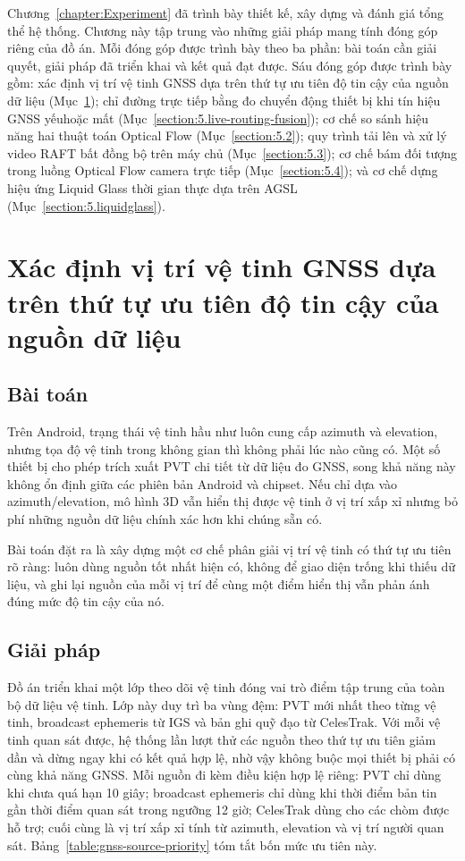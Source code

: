 \documentclass[../DoAn.tex]{subfiles}
\begin{document}
Chương~\ref{chapter:Experiment} đã trình bày thiết kế, xây dựng và đánh giá tổng thể hệ thống. Chương này tập trung vào những giải pháp mang tính đóng góp riêng của đồ án. Mỗi đóng góp được trình bày theo ba phần: bài toán cần giải quyết, giải pháp đã triển khai và kết quả đạt được. Sáu đóng góp được trình bày gồm: xác định vị trí vệ tinh GNSS dựa trên thứ tự ưu tiên độ tin cậy của nguồn dữ liệu (Mục~\ref{section:5.1}); chỉ đường trực tiếp bằng đo chuyển động thiết bị khi tín hiệu GNSS yếuhoặc mất (Mục~\ref{section:5.live-routing-fusion}); cơ chế so sánh hiệu năng hai thuật toán Optical Flow (Mục~\ref{section:5.2}); quy trình tải lên và xử lý video RAFT bất đồng bộ trên máy chủ (Mục~\ref{section:5.3}); cơ chế bám đối tượng trong luồng Optical Flow camera trực tiếp (Mục~\ref{section:5.4}); và cơ chế dựng hiệu ứng Liquid Glass thời gian thực dựa trên AGSL (Mục~\ref{section:5.liquidglass}).

\section{Xác định vị trí vệ tinh GNSS dựa trên thứ tự ưu tiên độ tin cậy của nguồn dữ liệu}
\label{section:5.1}
\subsection{Bài toán}
Trên Android, trạng thái vệ tinh hầu như luôn cung cấp azimuth và elevation, nhưng tọa độ vệ tinh trong không gian thì không phải lúc nào cũng có. Một số thiết bị cho phép trích xuất PVT chi tiết từ dữ liệu đo GNSS, song khả năng này không ổn định giữa các phiên bản Android và chipset. Nếu chỉ dựa vào azimuth/elevation, mô hình 3D vẫn hiển thị được vệ tinh ở vị trí xấp xỉ nhưng bỏ phí những nguồn dữ liệu chính xác hơn khi chúng sẵn có.

Bài toán đặt ra là xây dựng một cơ chế phân giải vị trí vệ tinh có thứ tự ưu tiên rõ ràng: luôn dùng nguồn tốt nhất hiện có, không để giao diện trống khi thiếu dữ liệu, và ghi lại nguồn của mỗi vị trí để cùng một điểm hiển thị vẫn phản ánh đúng mức độ tin cậy của nó.

\subsection{Giải pháp}
Đồ án triển khai một lớp theo dõi vệ tinh đóng vai trò điểm tập trung của toàn bộ dữ liệu vệ tinh. Lớp này duy trì ba vùng đệm: PVT mới nhất theo từng vệ tinh, broadcast ephemeris từ IGS và bản ghi quỹ đạo từ CelesTrak. Với mỗi vệ tinh quan sát được, hệ thống lần lượt thử các nguồn theo thứ tự ưu tiên giảm dần và dừng ngay khi có kết quả hợp lệ, nhờ vậy không buộc mọi thiết bị phải có cùng khả năng GNSS. Mỗi nguồn đi kèm điều kiện hợp lệ riêng: PVT chỉ dùng khi chưa quá hạn 10 giây; broadcast ephemeris chỉ dùng khi thời điểm bản tin gần thời điểm quan sát trong ngưỡng 12 giờ; CelesTrak dùng cho các chòm được hỗ trợ; cuối cùng là vị trí xấp xỉ tính từ azimuth, elevation và vị trí người quan sát. Bảng~\ref{table:gnss-source-priority} tóm tắt bốn mức ưu tiên này.
\end{document}

